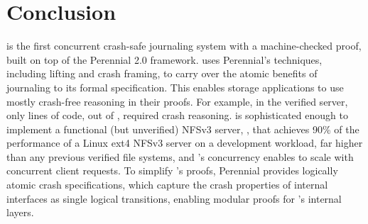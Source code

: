 \section{Conclusion}
\label{sec:gotxn:concl}

\txn is the first concurrent crash-safe journaling
system with a machine-checked proof, built on top of the Perennial 2.0 framework.
\txn uses Perennial's techniques, including lifting and crash framing, to
carry over the atomic benefits of journaling to its formal specification.
This enables storage applications to use mostly crash-free reasoning in
their proofs.  For example, in the verified \simplenfs server, only \simplenfsCrashLOC{}
lines of code, out of \simplenfsLOC{}, required crash reasoning.  \txn is sophisticated
enough to implement a functional (but unverified) NFSv3 server, \gnfs, that achieves
90\% of the performance of a Linux ext4 NFSv3 server on a development workload, far higher than
any previous verified file systems, and \txn's concurrency enables \gnfs
to scale with concurrent client requests.  To simplify \txn's proofs,
Perennial provides logically atomic crash specifications, which capture the
crash properties of internal interfaces as single logical transitions,
enabling modular proofs for \txn's internal layers.
